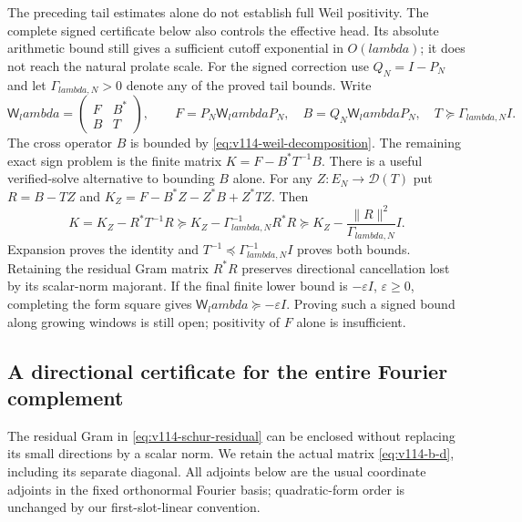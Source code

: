 \documentclass[11pt]{article}
\def\lambda{lambda}%
\theoremstyle{remark}
\begin{document}
The preceding tail estimates alone do not establish full Weil positivity.
The complete signed certificate below also controls the effective head.
Its absolute arithmetic bound still gives a sufficient cutoff
exponential in $O(\lambda)$; it does not reach the natural prolate
scale. For the signed correction use $Q_N=I-P_N$ and let
$\Gamma_{\lambda,N}>0$ denote any of the proved tail bounds. Write
\[
 \mathsf W_\lambda=
 \begin{pmatrix}F&B^*\\B&T\end{pmatrix},\qquad
 F=P_N\mathsf W_\lambda P_N,\quad
 B=Q_N\mathsf W_\lambda P_N,\quad T\succeq\Gamma_{\lambda,N}I.
\]
The cross operator $B$ is bounded by \eqref{eq:v114-weil-decomposition}.
The remaining exact sign problem is the finite matrix
$K=F-B^*T^{-1}B$. There is a useful verified-solve alternative to
bounding $B$ alone. For any $Z:E_N\to\mathcal D(T)$ put
$R=B-TZ$ and $K_Z=F-B^*Z-Z^*B+Z^*TZ$. Then
\begin{equation}\label{eq:v114-schur-residual}
 K=K_Z-R^*T^{-1}R
 \succeq K_Z-\Gamma_{\lambda,N}^{-1}R^*R
 \succeq K_Z-\frac{\|R\|^2}{\Gamma_{\lambda,N}}I.
\end{equation}
Expansion proves the identity and $T^{-1}\preceq\Gamma_{\lambda,N}^{-1}I$
proves both bounds. Retaining the residual Gram matrix $R^*R$ preserves
directional cancellation lost by its scalar-norm majorant.
If the final finite lower bound is
$-\varepsilon I$, $\varepsilon\ge0$, completing the form square
gives $\mathsf W_\lambda\succeq-\varepsilon I$.
Proving such a signed bound along growing windows is still open;
positivity of $F$ alone is insufficient.

\subsection{A directional certificate for the entire Fourier complement}

The residual Gram in \eqref{eq:v114-schur-residual} can be enclosed
without replacing its small directions by a scalar norm.  We retain
the actual matrix \eqref{eq:v114-b-d}, including its separate diagonal.
All adjoints below are the usual coordinate adjoints in the fixed
orthonormal Fourier basis; quadratic-form order is unchanged by our
first-slot-linear convention.
\end{document}
